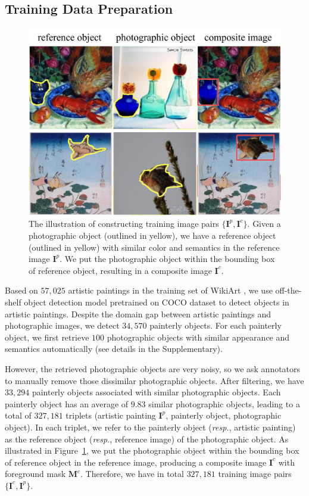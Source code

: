 \documentclass[letterpaper]{article} %
\begin{document}
\subsection{Training Data Preparation}\label{sec:train_data_preparation}


\begin{figure}[t]
\centering
\includegraphics[width=0.9\linewidth]{figures/reference_object_main.jpg}
\caption{The illustration of constructing training image pairs $\{\bm{I}^p, \bm{I}^c\}$. Given a photographic object (outlined in yellow), we have a reference object  (outlined in yellow) with similar color and semantics in the reference image $\bm{I}^p$. We put the photographic object within the bounding box of reference object, resulting in a composite image $\bm{I}^c$. }
\label{fig:pair_construction}
\end{figure}


Based on $57,025$ artistic paintings in the training set of WikiArt \cite{nichol2016painter}, we use off-the-shelf object detection model \cite{wu2019detectron2} pretrained on COCO \cite{lin2014microsoft} dataset to detect objects in artistic paintings. Despite the domain gap between artistic paintings and photographic images, we detect $34,570$ painterly objects.
For each painterly object, we first retrieve $100$ photographic objects with similar appearance and semantics automatically (see details in the Supplementary).

However, the retrieved photographic objects are very noisy, so we ask annotators to manually remove those dissimilar photographic objects. After filtering, we have $33,294$ painterly objects associated with similar photographic objects.
Each painterly object has an average of $9.83$ similar photographic objects, leading to a total of $327,181$  triplets (artistic painting $\bm{I}^p$, painterly object, photographic object). In each triplet, we refer to the painterly object (\emph{resp.}, artistic painting) as the reference object (\emph{resp.}, reference image) of the photographic object. As illustrated in Figure~\ref{fig:pair_construction}, we put the photographic object within the bounding box of reference object in the reference image, producing a composite image $\bm{I}^c$ with foreground mask $\bm{M}^c$. Therefore, we have in total $327,181$ training image pairs $\{\bm{I}^c, \bm{I}^p\}$.
\end{document}
